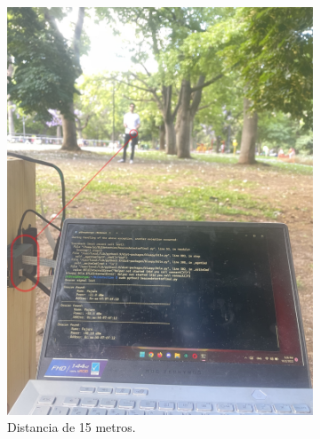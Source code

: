 \begin{figure}[H]
\centering
\ContinuedFloat
	\begin{subfigure}{0.3\textwidth}
		\centering
		\includegraphics[width=\linewidth]{ImagenesValidacion del prototipo/TINTCOM12ba}		
		\caption{Distancia de 15 metros.}
	\end{subfigure}\hspace*{2.5cm}
	\begin{subfigure}{0.3\textwidth}
		\centering

\end{subfigure}
\end{figure}
